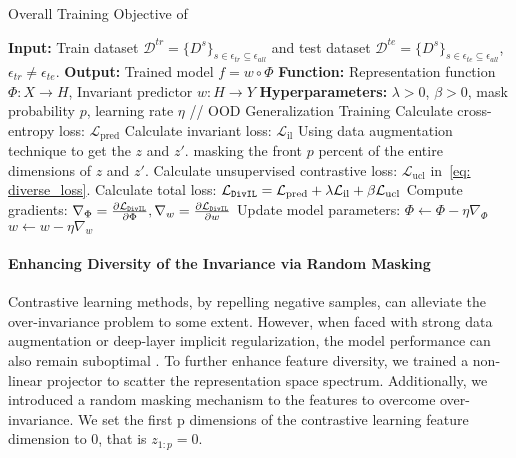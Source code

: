 \begin{algorithm}[t]
\caption{Overall Training Objective of \ours }
\begin{algorithmic}[1]
\State \textbf{Input:} Train dataset $\mathcal{D}^{tr} = \{D^s\}_{s \in \epsilon_{tr} \subseteq \epsilon_{all}}$
and test dataset 
$\mathcal{D}^{te} = \{D^s\}_{s \in \epsilon_{te} \subseteq \epsilon_{all}}$, $\epsilon_{tr} \neq \epsilon_{te}$.
\State \textbf{Output:} Trained model $f=w \circ \Phi$
\State \textbf{Function:} Representation function $\Phi: X \rightarrow H$,  Invariant predictor $w: H \rightarrow Y$
\State \textbf{Hyperparameters:} $\lambda > 0$, $\beta > 0$, mask probability $p$, learning rate $\eta$
\State // \ours OOD Generalization Training
        \State Calculate cross-entropy loss: $\mathcal{L}_{\text{pred}}$
        \State Calculate invariant loss: $\mathcal{L}_{\text{il}}$
        \State Using data augmentation technique to get the $z$ and $z'$.
        \State masking the front $p$ percent of the entire dimensions of $z$ and $z'$.
        \State Calculate unsupervised contrastive loss: $\mathcal{L}_{\text{ucl}}$ in~\eqref{eq: diverse_loss}.
        \State Calculate total loss: $\mathcal{L}_\texttt{DivIL} = \mathcal{L}_{\text{pred}} + \lambda \mathcal{L}_{\text{il}} + \beta \mathcal{L}_{\text{ucl}}$
        \State Compute gradients: $\nabla_{\Phi} = \frac{\partial \mathcal{L}_\texttt{DivIL}}{\partial \Phi}, \nabla_{w}=\frac{\partial \mathcal{L}_\texttt{DivIL}}{\partial w}$
        \State Update model parameters:
        \State \quad $\Phi \gets \Phi - \eta \nabla_{\Phi}$
        \State \quad $w \gets w - \eta \nabla_{w}$
    \EndFor
\end{algorithmic}
\label{al: divil}
\end{algorithm}

\paragraph{Enhancing Diversity of the Invariance via Random Masking}
Contrastive learning methods, by repelling negative samples, can alleviate the over-invariance problem to some extent. 
However, when faced with strong data augmentation or deep-layer implicit regularization, the model performance can also remain suboptimal \citep{DC_leCun}. 
To further enhance feature diversity, we trained a non-linear projector to scatter the representation space spectrum. 
Additionally, we introduced a random masking mechanism to the features to overcome over-invariance. 
We set the first p dimensions of the contrastive learning feature dimension to 0, that is $z_{1:p}=0$.

